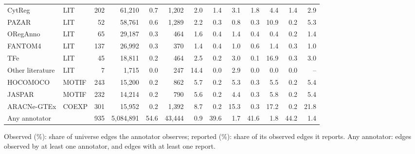 \begin{table}[htbp]
\begin{tabular}{@{}llrrrrrrrrrrr@{}}
CytReg & LIT & 202 & 61{,}210 & 0.7 & 1{,}202 & 2.0 & 1.4 & 3.1 & 1.8 & 4.4 & 1.4 & 2.9 \\
PAZAR & LIT & 52 & 58{,}761 & 0.6 & 1{,}289 & 2.2 & 0.3 & 0.8 & 0.3 & 10.9 & 0.2 & 5.3 \\
ORegAnno & LIT & 65 & 29{,}187 & 0.3 & 464 & 1.6 & 0.4 & 1.4 & 0.4 & 0.4 & 0.2 & 1.4 \\
FANTOM4 & LIT & 137 & 26{,}992 & 0.3 & 370 & 1.4 & 0.4 & 1.0 & 0.6 & 1.4 & 0.3 & 1.0 \\
TFe & LIT & 45 & 18{,}811 & 0.2 & 464 & 2.5 & 0.2 & 3.0 & 0.1 & 16.9 & 0.3 & 3.0 \\
Other literature & LIT & 7 & 1{,}715 & 0.0 & 247 & 14.4 & 0.0 & 2.9 & 0.0 & 0.0 & 0.0 & -- \\
HOCOMOCO & MOTIF & 243 & 15{,}200 & 0.2 & 862 & 5.7 & 0.2 & 5.3 & 0.3 & 5.5 & 0.2 & 5.4 \\
JASPAR & MOTIF & 232 & 14{,}214 & 0.2 & 790 & 5.6 & 0.2 & 4.4 & 0.3 & 5.8 & 0.2 & 5.4 \\
ARACNe-GTEx & COEXP & 301 & 15{,}952 & 0.2 & 1{,}392 & 8.7 & 0.2 & 15.3 & 0.3 & 17.2 & 0.2 & 21.8 \\
\midrule
Any annotator &  & 935 & 5{,}084{,}891 & 54.6 & 43{,}444 & 0.9 & 39.6 & 1.7 & 41.6 & 1.8 & 44.2 & 1.4 \\
\bottomrule
\end{tabular}
\par\smallskip
\begin{minipage}{\linewidth}\footnotesize
Observed (\%): share of universe edges the annotator observes; reported (\%): share of its observed edges it reports. Any annotator: edges observed by at least one annotator, and edges with at least one report.
\end{minipage}
\end{table}

